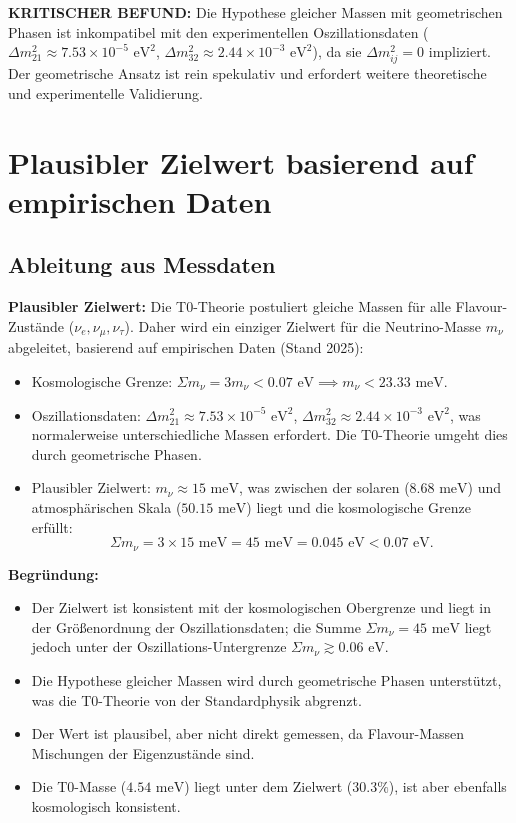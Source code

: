 	\begin{warning}
		\textbf{KRITISCHER BEFUND:} Die Hypothese gleicher Massen mit geometrischen Phasen ist inkompatibel mit den experimentellen Oszillationsdaten (\(\Delta m^2_{21} \approx 7.53 \times 10^{-5} \text{ eV}^2\), \(\Delta m^2_{32} \approx 2.44 \times 10^{-3} \text{ eV}^2\)), da sie \(\Delta m^2_{ij} = 0\) impliziert. Der geometrische Ansatz ist rein spekulativ und erfordert weitere theoretische und experimentelle Validierung.
	\end{warning}
	
	\section{Plausibler Zielwert basierend auf empirischen Daten}
	
	\subsection{Ableitung aus Messdaten}
	
	\begin{experimental}
		\textbf{Plausibler Zielwert:}
		Die T0-Theorie postuliert gleiche Massen für alle Flavour-Zustände (\(\nu_e, \nu_\mu, \nu_\tau\)). Daher wird ein einziger Zielwert für die Neutrino-Masse \(m_\nu\) abgeleitet, basierend auf empirischen Daten (Stand 2025):
		\begin{itemize}
			\item Kosmologische Grenze: \(\Sigma m_\nu = 3 m_\nu < 0.07 \text{ eV} \implies m_\nu < 23.33 \text{ meV}\).
			\item Oszillationsdaten: \(\Delta m^2_{21} \approx 7.53 \times 10^{-5} \text{ eV}^2\), \(\Delta m^2_{32} \approx 2.44 \times 10^{-3} \text{ eV}^2\), was normalerweise unterschiedliche Massen erfordert. Die T0-Theorie umgeht dies durch geometrische Phasen.
			\item Plausibler Zielwert: \(m_\nu \approx 15 \text{ meV}\), was zwischen der solaren (\(8.68 \text{ meV}\)) und atmosphärischen Skala (\(50.15 \text{ meV}\)) liegt und die kosmologische Grenze erfüllt:
			\[
			\Sigma m_\nu = 3 \times 15 \text{ meV} = 45 \text{ meV} = 0.045 \text{ eV} < 0.07 \text{ eV}.
			\]
		\end{itemize}
		
		\textbf{Begründung:}
		\begin{itemize}
			\item Der Zielwert ist konsistent mit der kosmologischen Obergrenze und liegt in der Größenordnung der Oszillationsdaten; die Summe \(\Sigma m_\nu = 45 \text{ meV}\) liegt jedoch unter der Oszillations-Untergrenze \(\Sigma m_\nu \gtrsim 0.06 \text{ eV}\).
			\item Die Hypothese gleicher Massen wird durch geometrische Phasen unterstützt, was die T0-Theorie von der Standardphysik abgrenzt.
			\item Der Wert ist plausibel, aber nicht direkt gemessen, da Flavour-Massen Mischungen der Eigenzustände sind.
			\item Die T0-Masse (\(4.54 \text{ meV}\)) liegt unter dem Zielwert (\(30.3\%\)), ist aber ebenfalls kosmologisch konsistent.
		\end{itemize}
	\end{experimental}
	
